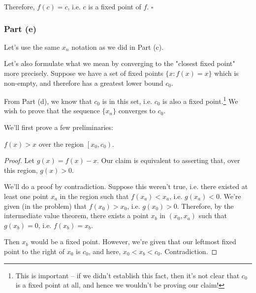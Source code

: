 
Therefore, $f(c) = c$, i.e. $c$ is a fixed point of $f$. $\square$

\subsubsection{Part (e)}

Let's use the same $x_n$ notation as we did in Part (c). 



Let's also formulate what we mean by converging to the "closest fixed point" more precisely. Suppose we have a set of fixed points $\{x : f(x) = x\}$ which is non-empty, and therefore has a greatest lower bound $c_0$. 

From Part (d), we know that $c_0$ is in this set, i.e. $c_0$ is also a fixed point.\footnote{This is important -- if we didn't establish this fact, then it's not clear that $c_0$ is a fixed point at all, and hence we wouldn't be proving our claim!} We wish to prove that the sequence $\{x_n\}$ converges to $c_0$.

We'll first prove a few preliminaries:

\begin{lemma}
\label{l:fp-iter-region}
$f(x) > x$ over the region $\left[x_0, c_0\right)$. 
\end{lemma}
\begin{proof}
Let $g(x) = f(x) - x$. Our claim is equivalent to asserting that, over this region, $g(x) > 0$.

We'll do a proof by contradiction. Suppose this weren't true, i.e. there existed at least one point $x_a$ in the region such that $f(x_a) < x_a$, i.e. $g(x_a) < 0$. We're given (in the problem) that $f(x_0) > x_0$, i.e. $g(x_0) > 0$. Therefore, by the intermediate value theorem, there exists a point $x_b$ in $(x_0, x_a)$ such that $g(x_b) = 0$, i.e. $f(x_b) = x_b$. 

Then $x_b$ would be a fixed point. However, we're given that our leftmost fixed point to the right of $x_0$ is $c_0$, and here, $x_0 < x_b < c_0$. Contradiction.
\end{proof}

